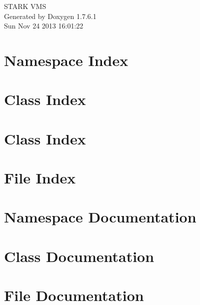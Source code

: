 \documentclass[a4paper]{book}
\begin{document}
\hypersetup{pageanchor=false,citecolor=blue}
\begin{titlepage}
\vspace*{7cm}
\begin{center}
{\Large \-S\-T\-A\-R\-K \-V\-M\-S }\\
\vspace*{1cm}
{\large \-Generated by Doxygen 1.7.6.1}\\
\vspace*{0.5cm}
{\small Sun Nov 24 2013 16:01:22}\\
\end{center}
\end{titlepage}
\clearemptydoublepage
{}
\tableofcontents
\clearemptydoublepage
{}
\hypersetup{pageanchor=true,citecolor=blue}
\chapter{\-Namespace \-Index}

\chapter{\-Class \-Index}

\chapter{\-Class \-Index}

\chapter{\-File \-Index}

\chapter{\-Namespace \-Documentation}





\chapter{\-Class \-Documentation}












\chapter{\-File \-Documentation}













\printindex
\end{document}
